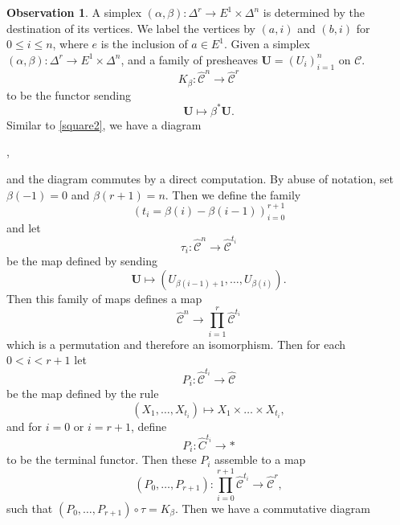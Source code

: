 \documentclass[a4paper]{article}
\numberwithin{equation}{subsection}
\theoremstyle{plain}   %
\theoremstyle{definition}
\newtheorem{obs}[equation]{Observation}
\theoremstyle{remark}
\theoremstyle{plain}
\DeclareMathOperator{\id}{id}
\newcommand{\overcat}[2]{{\left(#1\downarrow #2\right)}}
\newcommand{\psh}[1]{\ensuremath{\widehat{#1}}}
\providecommand{\C}{}
\renewcommand{\C}{\ensuremath{\mathcal{C}}}
\newcommand{\ssetlab}{\ensuremath{\widehat{\Delta} \int \widehat{\mathcal{C}}}}
\begin{document}
\begin{obs}\label{joyalsquare2}
	A simplex \((\alpha,\beta):\Delta^r \to E^1\times \Delta^n\) is determined by the destination of its vertices.  We label the vertices by \((a,i)\) and \((b,i)\) for \(0\leq i \leq n\), where \(e\) is the inclusion of \(a \in E^1\).  Given a simplex \((\alpha,\beta):\Delta^r\to E^1\times \Delta^n\), and a family of presheaves \(\mathbf{U}=(U_i)_{i=1}^n\) on \(\C\). 
	\[K_{\beta}:\psh{\C}^n \to \psh{\C}^r\]
	to be the functor sending
	\[\mathbf{U} \mapsto \beta^\ast \mathbf{U}.\]
	Similar to \ref{square2}, we have a diagram
	\begin{center}
		,
	\end{center}
	and the diagram commutes by a direct computation.  
	By abuse of notation, set \(\beta(-1)=0\) and \(\beta(r+1)=n\).  Then we define the family
	\[(t_i=\beta(i) - \beta(i-1))_{i=0}^{r+1}\] and let 
	\[\tau_i:\psh{\C}^n \to \psh{\C}^{t_i}\]
	be the map defined by sending 
	\[\mathbf{U}\mapsto (U_{\beta(i-1)+1},\dots,U_{\beta(i)}).\]
	Then this family of maps defines a map 
	\[\psh{\C}^n \to \prod_{i=1}^r\psh{\C}^{t_i}\]
	which is a permutation and therefore an isomorphism. Then for each \(0<i<r+1\) let
	\[P_i:\psh{\C}^{t_i} \to \psh{\C}\]
	be the map defined by the rule 
	\[(X_1,\dots,X_{t_i})\mapsto X_1\times \dots \times X_{t_i},\]
	and for \(i=0\) or \(i=r+1\), define 
	\[P_i:\psh{C}^{t_i} \to \ast\]
	to be the terminal functor.
	Then these \(P_i\) assemble to a map 
	\[(P_0,\dots,P_{r+1}): \prod_{i=0}^{r+1} \psh{\C}^{t_i} \to \psh{\C}^r,\]
	such that \((P_0,\dots,P_{r+1})\circ \tau = K_\beta\).
	Then we have a commutative diagram
	\begin{center}
\end{center}
\end{obs}
\end{document}
